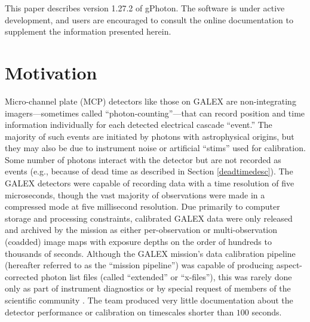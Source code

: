 \documentclass[preprint]{aastex}
\begin{document}
This paper describes version 1.27.2 of gPhoton. The software is under active development, and users are encouraged to consult the online documentation to supplement the information presented herein.

\section{Motivation}
\label{motivation}
Micro-channel plate (MCP) detectors like those on GALEX are non-integrating imagers---sometimes called ``photon-counting''---that can record position and time information individually for each detected electrical cascade ``event.'' The majority of such events are initiated by photons with astrophysical origins, but they may also be due to instrument noise or artificial ``stims'' used for calibration. Some number of photons interact with the detector but are not recorded as events (e.g., because of dead time as described in Section \ref{deadtimedesc}). The GALEX detectors were capable of recording data with a time resolution of five microseconds, though the vast majority of observations were made in a compressed mode at five millisecond resolution. Due primarily to computer storage and processing constraints, calibrated GALEX data were only released and archived by the mission as either per-observation or multi-observation (coadded) image maps with exposure depths on the order of hundreds to thousands of seconds. Although the GALEX mission's data calibration pipeline (hereafter referred to as the ``mission pipeline'') was capable of producing aspect-corrected photon list files (called ``extended'' or ``x-files''), this was rarely done only as part of instrument diagnostics or by special request of members of the scientific community \citep{rob2005, wel2006, wel2007}. The team produced very little documentation about the detector performance or calibration on timescales shorter than $100$ seconds.
\end{document}
